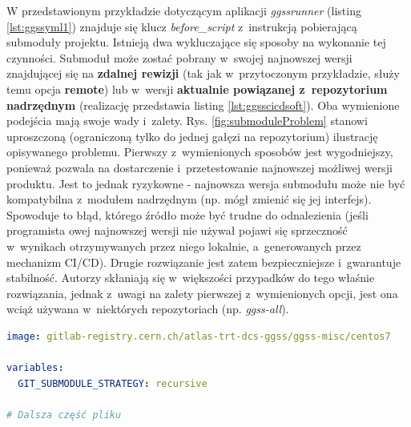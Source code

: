 W przedstawionym przykładzie dotyczącym aplikacji \textit{ggssrunner} (listing \ref{lst:ggssyml1}) znajduje się klucz \textit{before\_script} z~instrukcją pobierającą submoduły projektu. Istnieją dwa wykluczające się sposoby na wykonanie tej czynności. Submoduł może zostać pobrany w~swojej najnowszej wersji znajdującej się na \textbf{zdalnej rewizji} (tak jak w~przytoczonym przykładzie, służy temu opcja \textbf{remote}) lub w~wersji \textbf{aktualnie powiązanej z~repozytorium nadrzędnym} (realizację przedstawia listing \ref{lst:ggsscicdsoft}). Oba wymienione podejścia mają swoje wady i~zalety. Rys. \ref{fig:submoduleProblem} stanowi uproszczoną (ograniczoną tylko do jednej gałęzi na repozytorium) ilustrację opisywanego problemu. Pierwszy z~wymienionych sposobów jest wygodniejszy, ponieważ pozwala na dostarczenie i~przetestowanie najnowszej możliwej wersji produktu. Jest to jednak ryzykowne - najnowsza wersja submodułu może nie być kompatybilna z~modułem nadrzędnym (np. mógł zmienić się jej interfejs). Spowoduje to błąd, którego źródło może być trudne do odnalezienia (jeśli programista owej najnowszej wersji nie używał pojawi się sprzeczność w~wynikach otrzymywanych przez niego lokalnie, a~generowanych przez mechanizm CI/CD). Drugie rozwiązanie jest zatem bezpieczniejsze i~gwarantuje stabilność. Autorzy skłaniają się w~większości przypadków do tego właśnie rozwiązania, jednak z~uwagi na zalety pierwszej z~wymienionych opcji, jest ona wciąż używana w~niektórych repozytoriach (np. \textit{ggss-all}). 

\begin{lstlisting}[language=yaml,caption={Fragment pliku \textit{.gitlab-ci.yml} znajdującego się w~repozytorium \textit{ggss-software-libs} pobierający submoduły projektu w~wersji aktualnie powiązanej z~repozytorium nadrzędnym}, label={lst:ggsscicdsoft}]
image: gitlab-registry.cern.ch/atlas-trt-dcs-ggss/ggss-misc/centos7

variables:
  GIT_SUBMODULE_STRATEGY: recursive

# Dalsza część pliku

\end{lstlisting}

